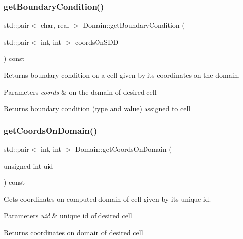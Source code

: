 \subsubsection{\texorpdfstring{get\+Boundary\+Condition()}{getBoundaryCondition()}}
{\footnotesize\ttfamily std\+::pair$<$ char, real $>$ Domain\+::get\+Boundary\+Condition (\begin{DoxyParamCaption}\item[{std\+::pair$<$ int, int $>$}]{coords\+On\+S\+DD }\end{DoxyParamCaption}) const}



Returns boundary condition on a cell given by its coordinates on the domain. 


\begin{DoxyParams}{Parameters}
{\em coords} & on the domain of desired cell\\
\hline
\end{DoxyParams}
\begin{DoxyReturn}{Returns}
boundary condition (type and value) assigned to cell 
\end{DoxyReturn}
\mbox{\label{classDomain_a1d2f7ee9336c682d4d6b01893d0beb4f}} 
\subsubsection{\texorpdfstring{get\+Coords\+On\+Domain()}{getCoordsOnDomain()}}
{\footnotesize\ttfamily std\+::pair$<$ int, int $>$ Domain\+::get\+Coords\+On\+Domain (\begin{DoxyParamCaption}\item[{unsigned int}]{uid }\end{DoxyParamCaption}) const}



Gets coordinates on computed domain of cell given by its unique id. 


\begin{DoxyParams}{Parameters}
{\em uid} & unique id of desired cell\\
\hline
\end{DoxyParams}
\begin{DoxyReturn}{Returns}
coordinates on domain of desired cell 
\end{DoxyReturn}
\mbox{\label{classDomain_acdb586f6ef994a1621680ec9b946aeb4}} 
